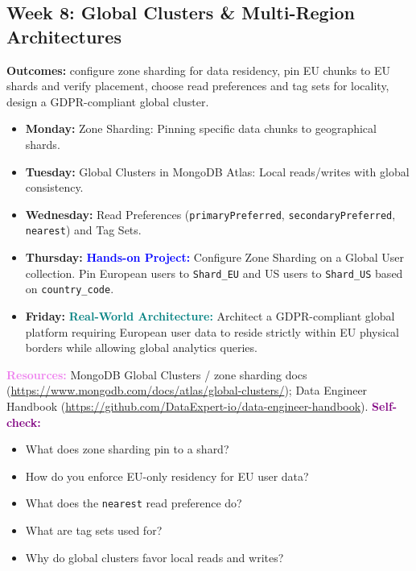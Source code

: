 \documentclass[11pt, a4paper]{article}
\newcommand{\project}[1]{\textbf{\textcolor{blue}{Hands-on Project:}} #1}
\newcommand{\usecase}[1]{\textbf{\textcolor{teal}{Real-World Architecture:}} #1}
\newcommand{\dayitem}[2]{\item \textbf{#1:} #2}
\newcommand{\selfcheck}[1]{\vspace{1mm}\noindent\textbf{\textcolor{purple}{Self-check:}} #1}
\newcommand{\resources}[1]{\vspace{1mm}\noindent\textbf{\textcolor{violet}{Resources:}} #1}
\begin{document}
\subsection*{Week 8: Global Clusters \& Multi-Region Architectures}
\par\noindent\textbf{Outcomes:} configure zone sharding for data residency, pin EU chunks to EU shards and verify placement, choose read preferences and tag sets for locality, design a GDPR-compliant global cluster.
\begin{itemize}[label=-]
    \dayitem{Monday}{Zone Sharding: Pinning specific data chunks to geographical shards.}
    \dayitem{Tuesday}{Global Clusters in MongoDB Atlas: Local reads/writes with global consistency.}
    \dayitem{Wednesday}{Read Preferences (\texttt{primaryPreferred}, \texttt{secondaryPreferred}, \texttt{nearest}) and Tag Sets.}
    \dayitem{Thursday}{\project{Configure Zone Sharding on a Global User collection. Pin European users to \texttt{Shard\_EU} and US users to \texttt{Shard\_US} based on \texttt{country\_code}.}}
    \dayitem{Friday}{\usecase{Architect a GDPR-compliant global platform requiring European user data to reside strictly within EU physical borders while allowing global analytics queries.}}
\end{itemize}
\resources{MongoDB Global Clusters / zone sharding docs (\url{https://www.mongodb.com/docs/atlas/global-clusters/}); Data Engineer Handbook (\url{https://github.com/DataExpert-io/data-engineer-handbook}).}
\selfcheck{\begin{itemize}[label=-, itemsep=0pt, leftmargin=1.5em]
    \item What does zone sharding pin to a shard?
    \item How do you enforce EU-only residency for EU user data?
    \item What does the \texttt{nearest} read preference do?
    \item What are tag sets used for?
    \item Why do global clusters favor local reads and writes?
\end{itemize}}
\end{document}
